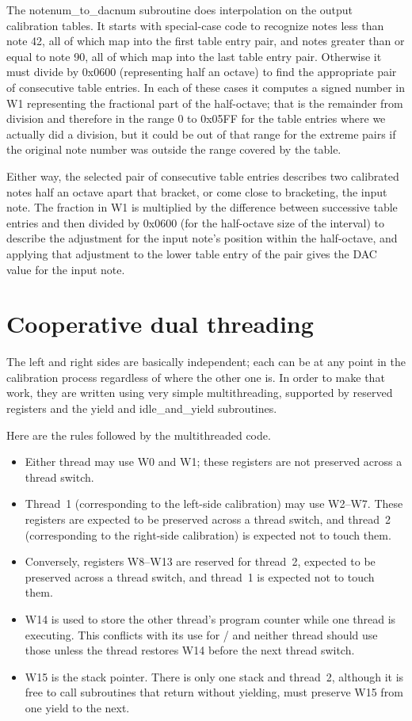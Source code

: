 The notenum\_to\_dacnum subroutine does interpolation on the output
calibration tables.  It starts with special-case code to recognize notes
less than note 42, all of which map into the first table entry pair, and
notes greater than or equal to note 90, all of which map into the last table
entry pair.  Otherwise it must divide by 0x0600 (representing half an
octave) to find the appropriate pair of consecutive table entries.  In each
of these cases it computes a signed number in W1 representing the fractional
part of the half-octave; that is the remainder from division and therefore
in the range 0 to 0x05FF for the table entries where we actually did a
division, but it could be out of that range for the extreme pairs if the
original note number was outside the range covered by the table.

Either way, the selected pair of consecutive table entries describes two
calibrated notes half an octave apart that bracket, or come close to
bracketing, the input note.  The fraction in W1 is multiplied by the
difference between successive table entries and then divided by 0x0600 (for
the half-octave size of the interval) to describe the adjustment for the
input note's position within the half-octave, and applying that adjustment
to the lower table entry of the pair gives the DAC value for the input note.

\section{Cooperative dual threading}

The left and right sides are basically independent; each can be at any point
in the calibration process regardless of where the other one is.  In order
to make that work, they are written using very simple multithreading,
supported by reserved registers and the yield and idle\_and\_yield
subroutines.

Here are the rules followed by the multithreaded code.

\begin{itemize}
\item Either thread may use W0 and W1; these registers are not preserved
across a thread switch.
\item Thread~1 (corresponding to the left-side calibration) may use W2--W7. 
These registers are expected to be preserved across a thread switch, and
thread~2 (corresponding to the right-side calibration) is expected not to
touch them.
\item Conversely, registers W8--W13 are reserved for thread~2, expected to
be preserved across a thread switch, and thread~1 is expected not to touch
them.
\item W14 is used to store the other thread's program counter while one
thread is executing.  This conflicts with its use for /
and neither thread should use those unless the thread restores W14 before
the next thread switch.
\item W15 is the stack pointer.  There is only one stack and thread~2,
although it is free to call subroutines that return without yielding, must
preserve W15 from one yield to the next.
\end{itemize}

